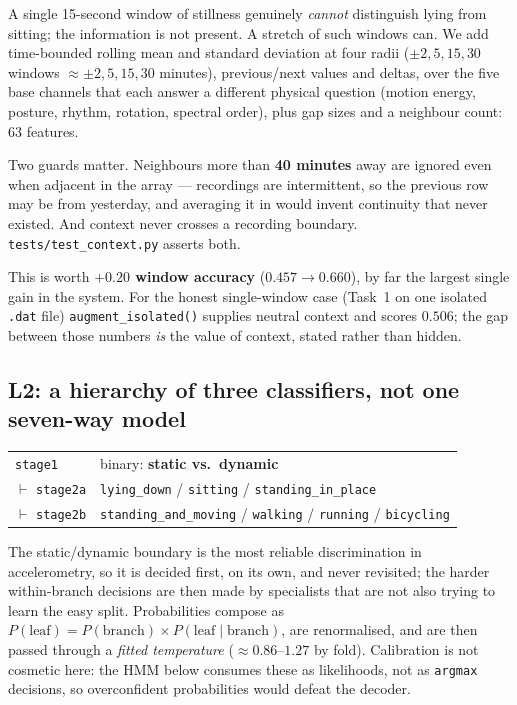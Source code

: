 \documentclass[11pt,a4paper]{article}
\newcommand{\code}[1]{\texttt{\small #1}}
\begin{document}
A single 15-second window of stillness genuinely \emph{cannot} distinguish lying from
sitting; the information is not present. A stretch of such windows can. We add
time-bounded rolling mean and standard deviation at four radii ($\pm 2, 5, 15, 30$
windows $\approx \pm 2, 5, 15, 30$ minutes), previous/next values and deltas, over the
five base channels that each answer a different physical question (motion energy,
posture, rhythm, rotation, spectral order), plus gap sizes and a neighbour count:
63 features.

Two guards matter. Neighbours more than \textbf{40 minutes} away are ignored even when
adjacent in the array --- recordings are intermittent, so the previous row may be from
yesterday, and averaging it in would invent continuity that never existed. And context
never crosses a recording boundary. \code{tests/test\_context.py} asserts both.

This is worth \textbf{$+0.20$ window accuracy} ($0.457 \rightarrow 0.660$), by far the
largest single gain in the system. For the honest single-window case (Task~1 on one
isolated \code{.dat} file) \code{augment\_isolated()} supplies neutral context and
scores $0.506$; the gap between those numbers \emph{is} the value of context, stated
rather than hidden.

\subsection{L2: a hierarchy of three classifiers, not one seven-way model}

\begin{center}
\small
\begin{tabular}{@{}ll@{}}
\code{stage1} & binary: \textbf{static vs.\ dynamic} \\
\quad $\vdash$ \code{stage2a} & \code{lying\_down} / \code{sitting} / \code{standing\_in\_place} \\
\quad $\vdash$ \code{stage2b} & \code{standing\_and\_moving} / \code{walking} / \code{running} / \code{bicycling} \\
\end{tabular}
\end{center}

The static/dynamic boundary is the most reliable discrimination in accelerometry, so it
is decided first, on its own, and never revisited; the harder within-branch decisions
are then made by specialists that are not also trying to learn the easy split.
Probabilities compose as $P(\text{leaf}) = P(\text{branch}) \times P(\text{leaf} \mid
\text{branch})$, are renormalised, and are then passed through a \emph{fitted
temperature} ($\approx 0.86$--$1.27$ by fold). Calibration is not cosmetic here: the
HMM below consumes these as likelihoods, not as \code{argmax} decisions, so
overconfident probabilities would defeat the decoder.
\end{document}
